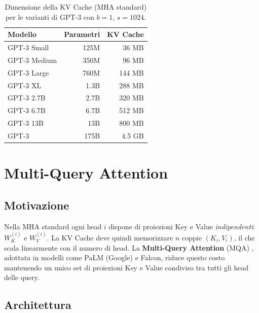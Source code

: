 \begin{table}[H]
  \centering
  \caption{Dimensione della KV Cache (MHA standard) per le varianti di GPT-3
           con $b=1$, $s=1024$.}
  \label{tab:kv-cache-size-mha}
  \small
  \begin{tabular}{lrr}
    \toprule
    \textbf{Modello} & \textbf{Parametri} & \textbf{KV Cache} \\
    \midrule
    GPT-3 Small  & 125M  & 36 MB  \\
    GPT-3 Medium & 350M  & 96 MB  \\
    GPT-3 Large  & 760M  & 144 MB \\
    GPT-3 XL     & 1.3B  & 288 MB \\
    GPT-3 2.7B   & 2.7B  & 320 MB \\
    GPT-3 6.7B   & 6.7B  & 512 MB \\
    GPT-3 13B    & 13B   & 800 MB \\
    GPT-3        & 175B  & 4.5 GB \\
    \bottomrule
  \end{tabular}
\end{table}

\section{Multi-Query Attention}
\label{sec:mqa}

\subsection{Motivazione}
\label{subsec:mqa-motivation}

Nella MHA standard ogni head $i$ dispone di proiezioni Key e Value
\emph{indipendenti}: $W_K^{(i)}$ e $W_V^{(i)}$. La KV Cache deve quindi
memorizzare $n$ coppie $(K_i, V_i)$, il che scala linearmente con il numero
di head. La \textbf{Multi-Query Attention} (MQA) \citep{shazeer2019fast},
adottata in modelli come PaLM (Google) e Falcon, riduce questo costo
mantenendo un unico set di proiezioni Key e Value condiviso tra tutti
gli head delle query.

\subsection{Architettura}
\label{subsec:mqa-architecture}

